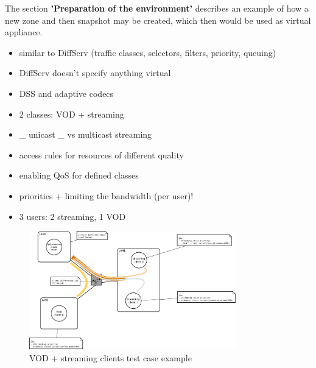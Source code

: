 \documentclass[11pt]{book}
\begin{document}
        The section \textbf{'Preparation of the environment'} describes an example of how a new zone and then snapshot
        may be created, which then would be used as virtual appliance.




        \begin{itemize}
          \item similar to DiffServ (traffic classes, selectors, filters, priority, queuing)
          \item DiffServ doesn't specify anything virtual
          \item DSS and adaptive codecs
        \end{itemize}

        \begin{itemize}
          \item 2 classes: VOD + streaming
          \item \_ unicast \_ vs multicast streaming
          \item access rules for resources of different quality
          \item enabling QoS for defined classes
          \item priorities + limiting the bandwidth (per user)!
          \item 3 users: 2 streaming, 1 VOD
        \end{itemize}

        \begin{figure}[H]
          \begin{center}
            \includegraphics[width=0.8\textwidth]{img/test-case/diagram.pdf}
          \end{center}

          \caption{VOD + streaming clients test case example}
        \end{figure}
\end{document}
